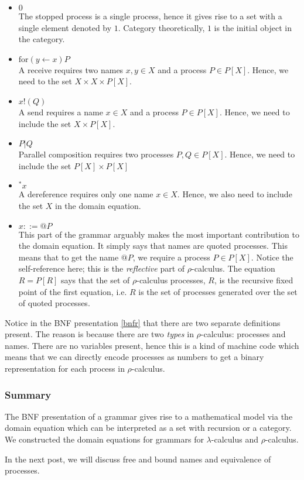 \documentclass[12pt]{article}
\numberwithin{equation}{section}
\begin{document}
\begin{itemize}
\item $0$ \\
The stopped process is a single process, hence it gives rise to a set with a single element denoted by $1$. Category theoretically, $1$ is the initial object in the category.

\item $\text{for}(y \leftarrow x)P$ \\
A receive requires two names $x, y \in X$ and a process $P \in P[X]$. Hence, we need to the set $X \times X \times P[X]$.

\item $x!(Q)$ \\
A send requires a name $x \in X$ and a process $P \in P[X]$. Hence, we need to include the set $X \times P[X]$.

\item $P|Q$ \\
Parallel composition requires two processes $P, Q \in P[X]$. Hence, we need to include the set $P[X] \times P[X]$

\item ${}^*x$ \\
A dereference requires only one name $x \in X$. Hence, we also need to include the set $X$ in the domain equation.

\item $x ::= @P$ \\
This part of the grammar arguably makes the most important contribution to the domain equation. It simply says that names are quoted processes. This means that to get the name $@P$, we require a process $P \in P[X]$. Notice the self-reference here; this is the \emph{reflective} part of $\rho$-calculus. The equation $R=P[R]$ says that the set of $\rho$-calculus processes, $R$, is the recursive fixed point of the first equation, i.e. $R$ is the set of processes generated over the set of quoted processes.
\end{itemize}

Notice in the BNF presentation \eqref{bnfr} that there are two separate definitions present. The reason is because there are two \emph{types} in $\rho$-calculus: processes and names. There are no variables present, hence this is a kind of machine code which means that we can directly encode processes as numbers to get a binary representation for each process in $\rho$-calculus.

\subsubsection{Summary}
The BNF presentation of a grammar gives rise to a mathematical model via the domain equation which can be interpreted as a set with recursion or a category. We constructed the domain equations for grammars for $\lambda$-calculus and $\rho$-calculus.

In the next post, we will discuss free and bound names and equivalence of processes.


\end{document}
